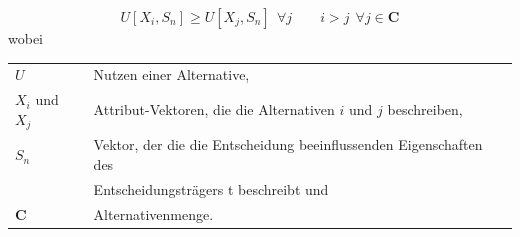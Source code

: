 \begin{equation} U[X_{i},S_{n}] \geq U[X_{j},S_{n}] \ \ \forall j \qquad i > j \ \ \forall j \in \mathbf{C}
\end{equation}
wobei \\ 
\begin{tabular}{ll}
$U $ & Nutzen einer Alternative,\\
$X_{i}$ und $X_{j} $ & Attribut-Vektoren, die die Alternativen $i$ und $j$ beschreiben,\\
$S_{n} $ & Vektor, der die die Entscheidung beeinflussenden Eigenschaften des \\
& Entscheidungsträgers t beschreibt und\\
$\mathbf{C} $ & Alternativenmenge.
\end{tabular}

